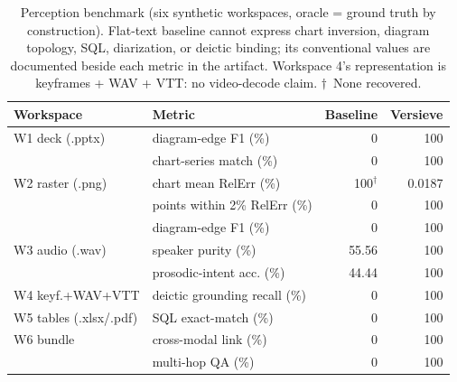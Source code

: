 \documentclass{article}
\begin{document}
\begin{table}[t]
\centering
\caption{Perception benchmark (six synthetic workspaces, oracle = ground truth by construction). Flat-text baseline cannot express chart inversion, diagram topology, SQL, diarization, or deictic binding; its conventional values are documented beside each metric in the artifact. Workspace 4's representation is keyframes + WAV + VTT: no video-decode claim. $\dagger$~None recovered.}
\label{tab:argon}
\scriptsize
\setlength{\tabcolsep}{3pt}
\begin{tabular}{llrr}
\toprule
Workspace & Metric & Baseline & Versieve \\
\midrule
W1 deck (.pptx) & diagram-edge F1 (\%) & 0 & 100 \\
 & chart-series match (\%) & 0 & 100 \\
W2 raster (.png) & chart mean RelErr (\%) & 100$^{\dagger}$ & 0.0187 \\
 & points within 2\% RelErr (\%) & 0 & 100 \\
 & diagram-edge F1 (\%) & 0 & 100 \\
W3 audio (.wav) & speaker purity (\%) & 55.56 & 100 \\
 & prosodic-intent acc. (\%) & 44.44 & 100 \\
W4 keyf.+WAV+VTT & deictic grounding recall (\%) & 0 & 100 \\
W5 tables (.xlsx/.pdf) & SQL exact-match (\%) & 0 & 100 \\
W6 bundle & cross-modal link (\%) & 0 & 100 \\
 & multi-hop QA (\%) & 0 & 100 \\
\bottomrule
\end{tabular}
\end{table}
\end{document}
